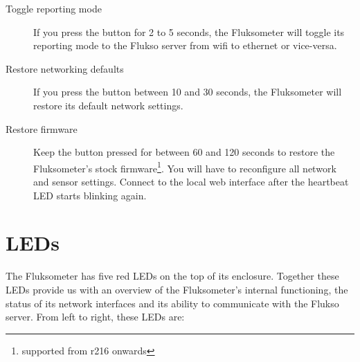 \begin{description}

\item[Toggle reporting mode] If you press the button for 2 to 5 seconds, the Fluksometer will toggle its reporting mode to the Flukso server from wifi to ethernet or vice-versa.
\item[Restore networking defaults] If you press the button between 10 and 30 seconds, the Fluksometer will restore its default network settings.
\item[Restore firmware] Keep the button pressed for between 60 and 120 seconds to restore the Fluksometer's stock firmware\footnote{supported from r216 onwards}. You will have to reconfigure all network and sensor settings. Connect to the local web interface after the heartbeat LED starts blinking again.
\end{description}


\section{LEDs}
The Fluksometer has five red LEDs on the top of its enclosure. Together these LEDs provide us with an overview of the Fluksometer's internal functioning, the status of its network interfaces and its ability to communicate with the Flukso server. From left to right, these LEDs are:

